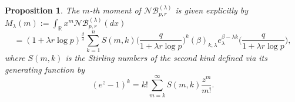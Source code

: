 \documentclass{birkjour}
\newtheorem{prop}[thm]{Proposition}
\theoremstyle{definition}
\theoremstyle{remark}
\numberwithin{equation}{section}
\begin{document}
\begin{prop}
The $m$-th moment of
$\mathcal{N}\mathcal{B}^{(\lambda)}_{p, r}$ is given explicitly by\\

$M_{\lambda}(m):=\displaystyle{\int_{\mathbb{R}}x^{m}\mathcal{N}\mathcal{B}^{(\lambda)}_{p,
r}(dx)}$
\begin{equation}\label{m-th-Moments}
=\displaystyle{(1+\lambda r\log p)^{\frac{\beta}{\lambda}}
\sum^{n}_{k=1}S(m, k)\Big(\frac{q}{1+\lambda r\log
p}\Big)^{k}(\beta)_{k, \lambda}e^{\beta-\lambda
k}_{\lambda}\Big(\frac{q}{1+\lambda r\log p}\Big)},
\end{equation}
where $S(m, k)$ is the Stirling numbers of the second kind defined
via its generating function by
\begin{equation}\label{Stir-2}
\displaystyle{(e^{z}-1)^{k}=k!\sum^{\infty}_{m=k}S(m,
k)\frac{z^{m}}{m!}}.
\end{equation}
\end{prop}
\end{document}

